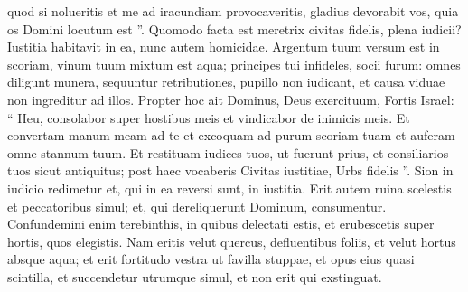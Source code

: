 \begin{biblechapter}
 \verse quod si nolueritis et me ad iracundiam provocaveritis,
 gladius devorabit vos,
 quia os Domini locutum est ”.
 \verse Quomodo facta est meretrix
 civitas fidelis, plena iudicii?
 Iustitia habitavit in ea,
 nunc autem homicidae.
 \verse Argentum tuum versum est in scoriam,
 vinum tuum mixtum est aqua;
 \verse principes tui infideles, socii furum:
 omnes diligunt munera, sequuntur retributiones,
 pupillo non iudicant, et causa viduae non ingreditur ad illos.
 \verse Propter hoc ait Dominus, Deus exercituum, Fortis Israel:
 “ Heu, consolabor super hostibus meis
 et vindicabor de inimicis meis.
 \verse Et convertam manum meam ad te
 et excoquam ad purum scoriam tuam
 et auferam omne stannum tuum.
 \verse Et restituam iudices tuos, ut fuerunt prius,
 et consiliarios tuos sicut antiquitus;
 post haec vocaberis Civitas iustitiae, Urbs fidelis ”.
 \verse Sion in iudicio redimetur
 et, qui in ea reversi sunt, in iustitia.
 \verse Erit autem ruina scelestis et peccatoribus simul;
 et, qui dereliquerunt Dominum, consumentur.
 \verse Confundemini enim terebinthis, in quibus delectati estis,
 et erubescetis super hortis, quos elegistis.
 \verse Nam eritis velut quercus, defluentibus foliis,
 et velut hortus absque aqua;
 \verse et erit fortitudo vestra ut favilla stuppae,
 et opus eius quasi scintilla,
 et succendetur utrumque simul, et non erit qui exstinguat.
 

\end{biblechapter}
